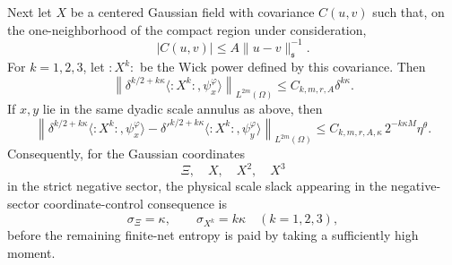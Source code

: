 \begin{proposition}
Next let \(X\) be a centered Gaussian field with covariance \(C(u,v)\) such
that, on the one-neighborhood of the compact region under consideration,
\begin{equation}
  |C(u,v)|\leq A\|u-v\|_{\mathfrak s}^{-1}.
  \label{eq:spde-x-covariance-singularity}
\end{equation}
For \(k=1,2,3\), let \(:X^k:\) be the Wick power defined by this covariance.
Then
\begin{equation}
  \left\|
    \delta^{k/2+k\kappa}
    \langle :X^k:,\psi_x^\varphi\rangle
  \right\|_{L^{2m}(\Omega)}
  \leq
  C_{k,m,r,A}\delta^{k\kappa}.
  \label{eq:spde-wick-coordinate-scale}
\end{equation}
If \(x,y\) lie in the same dyadic scale annulus as above, then
\begin{equation}
  \left\|
    \delta^{k/2+k\kappa}
    \langle :X^k:,\psi_x^\varphi\rangle
    -
    {\delta'}^{k/2+k\kappa}
    \langle :X^k:,\psi_y^\varphi\rangle
  \right\|_{L^{2m}(\Omega)}
  \leq
  C_{k,m,r,A,\kappa}\,2^{-k\kappa M}\eta^\theta .
  \label{eq:spde-wick-coordinate-edge}
\end{equation}
Consequently, for the Gaussian coordinates
\[
  \Xi,\quad X,\quad X^2,\quad X^3
\]
in the strict negative sector, the physical scale slack appearing in
the negative-sector coordinate-control consequence is
\[
  \sigma_\Xi=\kappa,\qquad
  \sigma_{X^k}=k\kappa\quad(k=1,2,3),
\]
before the remaining finite-net entropy is paid by taking a sufficiently high
moment.
\end{proposition}

